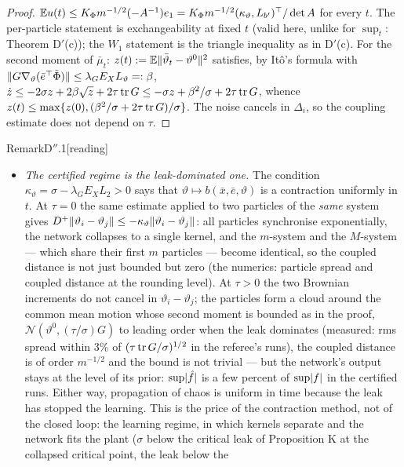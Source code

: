 \begin{proof}
$\mathbb{E} u(t) \le K_\Phi m^{-1/2}(-A^{-1})e_1 = K_\Phi m^{-1/2}(\kappa_\vartheta,L_{b'})^\top/\det A$ for every $t$. The
per-particle statement is exchangeability at fixed $t$ (valid here, unlike for $\sup_t$: Theorem D$'$(c)); the $W_1$
statement is the triangle inequality as in D$'$(c). For the second moment of $\bar\mu_t$:
$z(t) := \mathbb{E}\lVert \bar\vartheta_t - \vartheta^0\rVert^2$ satisfies, by It\^o's formula with
$\lVert G\nabla_\vartheta(\bar e^\top\tilde\Phi)\rVert \le \lambda_GE_XL_\vartheta =: \beta$,
$\dot z \le -2\sigma z + 2\beta\sqrt z + 2\tau\operatorname{tr} G \le -\sigma z + \beta^2/\sigma + 2\tau\operatorname{tr} G$, whence
$z(t) \le \max\{z(0),(\beta^2/\sigma + 2\tau\operatorname{tr} G)/\sigma\}$. The noise cancels in $\Delta_i$, so the coupling
estimate does not depend on $\tau$.
\end{proof}

\begin{rmk}{Remark}{D$''$.1}[reading]\mbox{}
\begin{itemize}
  \item \emph{The certified regime is the leak-dominated one.} The condition
    $\kappa_\vartheta = \sigma - \lambda_GE_XL_2 > 0$ says that $\vartheta\mapsto b(\bar x,\bar e,\vartheta)$ is a
    contraction uniformly in $t$. At $\tau = 0$ the same estimate applied to two particles of the \emph{same} system
    gives $D^+\lVert \vartheta_i - \vartheta_j\rVert \le -\kappa_\vartheta\lVert \vartheta_i - \vartheta_j\rVert$: all particles
    synchronise exponentially, the network collapses to a single kernel, and the $m$-system and the $M$-system ---
    which share their first $m$ particles --- become identical, so the coupled distance is not just bounded but zero
    (the numerics: particle spread and coupled distance at the rounding level). At $\tau > 0$ the two Brownian
    increments do not cancel in $\vartheta_i - \vartheta_j$; the particles form a cloud around the common mean motion
    whose second moment is bounded as in the proof, $\mathcal{N}(\vartheta^0,(\tau/\sigma)G)$ to leading order when
    the leak dominates (measured: rms spread within 3\% of $(\tau\operatorname{tr} G/\sigma)^{1/2}$ in the referee's runs), the
    coupled distance is of order $m^{-1/2}$ and the bound is not trivial --- but the network's output stays at the
    level of its prior: $\sup\lvert \hat f\rvert$ is a few percent of $\sup\lvert f\rvert$ in the certified runs. Either way,
    propagation of chaos is uniform in time because the leak has stopped the learning. This is the price of the
    contraction method, not of the closed loop: the learning regime, in which kernels separate and the network fits
    the plant ($\sigma$ below the critical leak of Proposition K at the collapsed critical point, the leak below the

\end{itemize}
\end{rmk}

